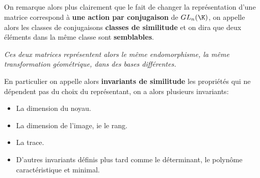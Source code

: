 \subsection*{}

On remarque alors plus clairement que le fait de changer la représentation d'une matrice correspond à \textbf{une action par conjugaison} de \( GL_n(\K) \), on appelle alors les classes de conjugaisons \textbf{classes de similitude} et on dira que deux éléments dans la même classe sont \textbf{semblables}. 
\begin{center}
   \textit{Ces deux matrices représentent alors le même endomorphisme, la même transformation géométrique, dans des bases différentes.}
\end{center}
En particulier on appelle alors \textbf{invariants de similitude} les propriétés qui ne dépendent pas du choix du représentant, on a alors plusieurs invariants:
\begin{itemize}
   \item La dimension du noyau.
   \item La dimension de l'image, ie le rang.
   \item La trace.
   \item D'autres invariants définis plus tard comme le déterminant, le polynôme caractéristique et minimal.
\end{itemize}   
\pagebreak
\subsection*{}

